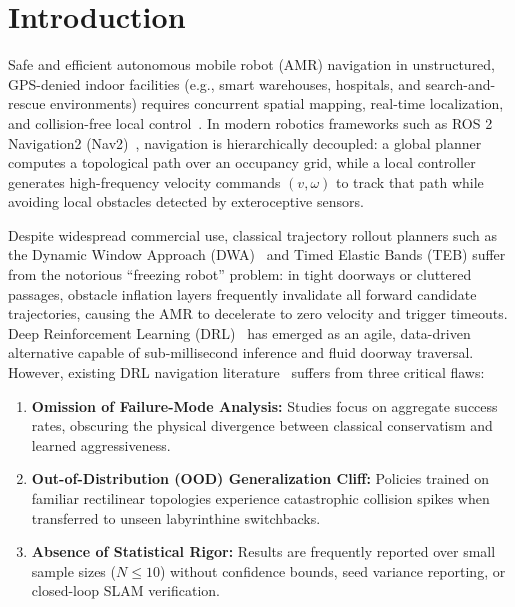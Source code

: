 \documentclass[runningheads]{llncs}
\begin{document}
\section{Introduction}
Safe and efficient autonomous mobile robot (AMR) navigation in unstructured, GPS-denied indoor facilities (e.g., smart warehouses, hospitals, and search-and-rescue environments) requires concurrent spatial mapping, real-time localization, and collision-free local control~\cite{macenski2021slam, macenski2020marathon, macenski2023survey}. In modern robotics frameworks such as ROS 2 Navigation2 (Nav2)~\cite{macenski2020marathon}, navigation is hierarchically decoupled: a global planner computes a topological path over an occupancy grid, while a local controller generates high-frequency velocity commands $(v, \omega)$ to track that path while avoiding local obstacles detected by exteroceptive sensors.

Despite widespread commercial use, classical trajectory rollout planners such as the Dynamic Window Approach (DWA)~\cite{fox1997dwa} and Timed Elastic Bands (TEB) suffer from the notorious ``freezing robot'' problem: in tight doorways or cluttered passages, obstacle inflation layers frequently invalidate all forward candidate trajectories, causing the AMR to decelerate to zero velocity and trigger timeouts. Deep Reinforcement Learning (DRL)~\cite{schulman2017ppo, tai2017virtual} has emerged as an agile, data-driven alternative capable of sub-millisecond inference and fluid doorway traversal. However, existing DRL navigation literature~\cite{kastner2021arena, kastner2022arenabench, perumalla2020barn} suffers from three critical flaws:
\begin{enumerate}
    \item \textbf{Omission of Failure-Mode Analysis:} Studies focus on aggregate success rates, obscuring the physical divergence between classical conservatism and learned aggressiveness.
    \item \textbf{Out-of-Distribution (OOD) Generalization Cliff:} Policies trained on familiar rectilinear topologies experience catastrophic collision spikes when transferred to unseen labyrinthine switchbacks.
    \item \textbf{Absence of Statistical Rigor:} Results are frequently reported over small sample sizes ($N \le 10$) without confidence bounds, seed variance reporting, or closed-loop SLAM verification.
\end{enumerate}
\end{document}
